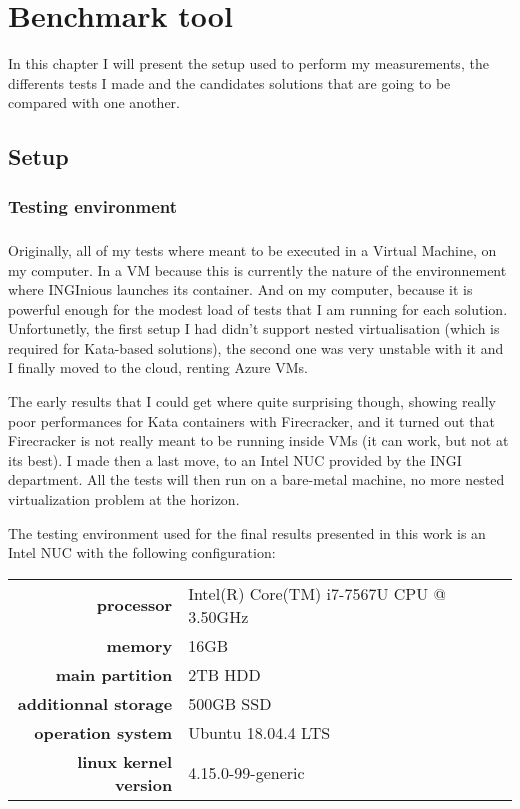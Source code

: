 \chapter{Benchmark tool}
In this chapter I will present the setup used to perform my measurements, the differents tests I made and the candidates solutions that are going to be compared with one another.

\section{Setup}
\subsection{Testing environment}

\paragraph{}Originally, all of my tests where meant to be executed in a Virtual Machine, on my computer.  In a VM because this is currently the nature of the environnement where INGInious launches its container.  And on my computer, because it is  powerful enough for the modest load of tests that I am running for each solution.  Unfortunetly, the first setup I had didn't support nested virtualisation (which is required for Kata-based solutions), the second one was very unstable with it and I finally moved to the cloud, renting Azure VMs.  

The early results that I could get where quite surprising though, showing really poor performances for Kata containers with Firecracker, and it turned out that Firecracker is not really meant to be running inside VMs (it can work, but not at its best).  I made then a last move, to an Intel NUC provided by the INGI department.  All the tests will then run on a bare-metal machine, no more nested virtualization problem at the horizon.

The testing environment used for the final results presented in this work is an Intel NUC with the following configuration:\\
\begin{tabular}{rl}

  \textbf{processor} & Intel(R) Core(TM) i7-7567U CPU @ 3.50GHz \\
  \textbf{memory} & 16GB \\
  \textbf{main partition} & 2TB HDD \\
  \textbf{additionnal storage} & 500GB SSD \\
  \textbf{operation system} & Ubuntu 18.04.4 LTS \\
  \textbf{linux kernel version} & 4.15.0-99-generic \\

\end{tabular}
